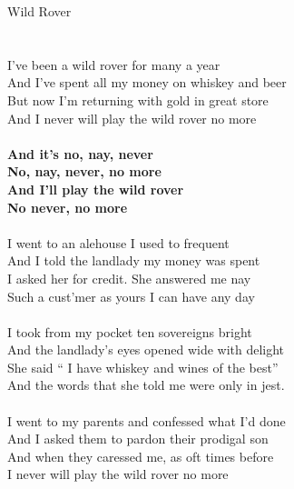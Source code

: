 \documentclass[letterpaper,9pt]{article}
\begin{document}
\newpage
{}
\huge
Wild Rover\\
\\
\LARGE
\noindent
\\I’ve been a wild rover for many a year
\\And I’ve spent all my money on whiskey and beer
\\But now I’m returning with gold in great store
\\And I never will play the wild rover no more
\\
\\\textbf{And it’s no, nay, never
\\No, nay, never, no more
\\And I’ll play the wild rover 
\\No never, no more}
\\
\\I went to an alehouse I used to frequent
\\And I told the landlady my money was spent
\\I asked her for credit. She answered me nay
\\Such a cust’mer as yours I can have any day
\\
\\I took from my pocket ten sovereigns bright
\\And the landlady’s eyes opened wide with delight
\\She said “ I have whiskey and wines of the best”
\\And the words that she told me were only in jest.
\\
\\I went to my parents and confessed what I’d done
\\And I asked them to pardon their prodigal son
\\And when they caressed me, as oft times before
\\I never will play the wild rover no more
\end{document}
